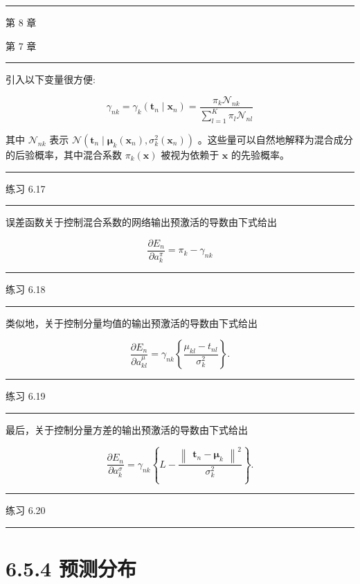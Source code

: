 \documentclass[10pt]{article}
\newcommand{\HRule}{\begin{center}\rule{0.9\linewidth}{0.2mm}\end{center}}
\begin{document}
\HRule

第 8 章

第 7 章

\HRule

引入以下变量很方便:

\[
{\gamma }_{nk} = {\gamma }_{k}\left( {{\mathbf{t}}_{n} \mid  {\mathbf{x}}_{n}}\right)  = \frac{{\pi }_{k}{\mathcal{N}}_{nk}}{\mathop{\sum }\limits_{{l = 1}}^{K}{\pi }_{l}{\mathcal{N}}_{nl}} \tag{6.44}
\]

其中 \({\mathcal{N}}_{nk}\) 表示 \(\mathcal{N}\left( {{\mathbf{t}}_{n} \mid  {\mathbf{\mu }}_{k}\left( {\mathbf{x}}_{n}\right) ,{\sigma }_{k}^{2}\left( {\mathbf{x}}_{n}\right) }\right)\) 。这些量可以自然地解释为混合成分的后验概率，其中混合系数 \({\pi }_{k}\left( \mathbf{x}\right)\) 被视为依赖于 \(\mathbf{x}\) 的先验概率。

\HRule

练习 6.17

\HRule

误差函数关于控制混合系数的网络输出预激活的导数由下式给出

\[
\frac{\partial {E}_{n}}{\partial {a}_{k}^{\pi }} = {\pi }_{k} - {\gamma }_{nk} \tag{6.45}
\]

\HRule

练习 6.18

\HRule

类似地，关于控制分量均值的输出预激活的导数由下式给出

\[
\frac{\partial {E}_{n}}{\partial {a}_{kl}^{\mu }} = {\gamma }_{nk}\left\{  \frac{{\mu }_{kl} - {t}_{nl}}{{\sigma }_{k}^{2}}\right\}  . \tag{6.46}
\]

\HRule

练习 6.19

\HRule

最后，关于控制分量方差的输出预激活的导数由下式给出

\[
\frac{\partial {E}_{n}}{\partial {a}_{k}^{\sigma }} = {\gamma }_{nk}\left\{  {L - \frac{{\begin{Vmatrix}{\mathbf{t}}_{n} - {\mathbf{\mu }}_{k}\end{Vmatrix}}^{2}}{{\sigma }_{k}^{2}}}\right\}  . \tag{6.47}
\]

\HRule

练习 6.20

\HRule

\section*{6.5.4 预测分布}
\end{document}
